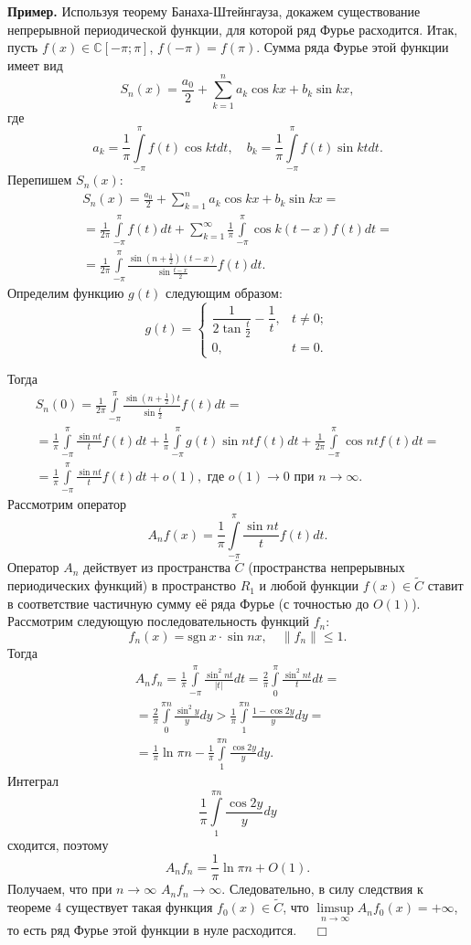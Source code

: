 \documentclass[12pt,a4paper, titlepage]{article}
\begin{document}
\textbf{Пример.} Используя теорему Банаха-Штейнгауза, докажем существование непрерывной периодической функции, для которой ряд Фурье расходится. Итак, пусть $f(x) \in \mathbb C [-\pi ; \pi]$, $f(-\pi) = f(\pi)$. Сумма ряда Фурье этой функции имеет вид
$$
S_n(x) = \frac {a_0} 2 + \sum_{k=1}^n a_k \cos kx + b_k \sin kx,
$$
где
$$
a_k = \frac 1 \pi \int\limits_{-\pi}^\pi f(t) \cos kt dt, \quad b_k = \frac 1 \pi \int\limits_{-\pi}^\pi f(t) \sin kt dt.
$$
Перепишем $S_n(x)$:
\begin{multline*}
S_n(x) = \frac {a_0} 2 + \sum_{k=1}^n a_k \cos kx + b_k \sin kx = \\
= \frac 1 {2\pi} \int\limits_{-\pi}^\pi f(t) dt +
\sum_{k=1}^\infty \frac 1 \pi \int\limits_{-\pi}^\pi \cos k(t-x) f(t) dt = \\
= \frac 1 {2\pi} \int\limits_{-\pi}^\pi \frac{\sin (n+ \frac 1 2)(t-x)}{\sin \frac{t-x} 2 } f(t) dt.
\end{multline*}
Определим функцию $g(t)$ следующим образом:
$$
g(t) = \begin{cases}
\dfrac 1 {2 \tan \frac t 2 } - \dfrac 1 t, & t \neq 0; \\
0, & t = 0.
\end{cases}
$$

Тогда
\begin{multline*}
S_n(0) = \frac 1 {2\pi} \int\limits_{-\pi}^\pi \frac {\sin (n+ \frac 1 2) t}{\sin \frac t 2} f(t) dt =  \\
= \frac 1 \pi \int\limits_{-\pi}^\pi \frac{\sin nt} t f(t) dt +
\frac 1 \pi \int\limits_{-\pi}^\pi g(t) \sin nt f(t) dt +
\frac 1 {2\pi} \int\limits_{-\pi}^\pi \cos nt f(t) dt = \\
= \frac 1 {\pi} \int\limits_{-\pi}^{\pi} \frac{\sin nt}{t} f(t) dt + o(1), \text{ где $o(1)\to 0$ при $n\to\infty$}.
\end{multline*}
Рассмотрим оператор
$$
A_n f(x) = \frac 1 \pi \int\limits_{-\pi}^\pi \frac {\sin nt} t f(t) dt.
$$
Оператор $A_n$ действует из пространства $\widetilde C$ (пространства непрерывных периодических функций) в пространство $R_1$ и любой функции $f(x) \in \widetilde C$ ставит в соответствие частичную сумму её ряда Фурье (с точностью до $O(1)$). Рассмотрим следующую последовательность функций $f_n$:
$$
f_n(x) = \mathrm{sgn} \ x \cdot \sin nx, \quad \|f_n\| \leqslant 1.
$$
Тогда
\begin{multline*}
A_n f_n = \frac 1 \pi \int\limits_{-\pi}^\pi \frac {\sin^2 nt}{|t|} dt =
\frac 2 \pi \int\limits_0^\pi \frac {\sin^2 nt} t dt = \\
= \frac 2 \pi \int\limits_0^{\pi n} \frac {\sin^2 y} y dy >
\frac 1 \pi \int\limits_1^{\pi n} \frac{1 - \cos 2y}{y}dy = \\
= \frac 1 \pi \ln \pi n - \frac 1 \pi \int\limits_1^{\pi n} \frac{\cos 2y}{y}dy.
\end{multline*}
Интеграл
$$
\frac 1 \pi \int\limits_1^{\pi n} \frac{\cos 2y}{y}dy
$$
сходится, поэтому
$$
A_n f_n = \frac 1 \pi \ln \pi n + O(1).
$$
Получаем, что при $n\to\infty$ $A_n f_n \to \infty$. Следовательно, в силу следствия к теореме 4 существует такая функция $f_0(x) \in \widetilde C$, что $\limsup\limits_{n\to\infty} A_n f_0(x) = +\infty$, то есть ряд Фурье этой функции в нуле расходится. $\quad \Box$\\
\end{document}
